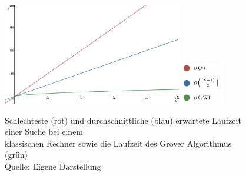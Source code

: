 \begin{figure}
    \centering
	\includegraphics[width=0.7\textwidth]{figures/laufzeit-aufgabenstellung.jpg}
    \includegraphics[width=0.165\textwidth]{figures/legende.png}

    \caption{Schlechteste (rot) und durchschnittliche (blau) erwartete Laufzeit einer Suche bei einem 
    \\klassischen Rechner sowie die Laufzeit des Grover Algorithmus (grün) 
    \\Quelle: Eigene Darstellung}

	\label{fig:laufzeitAufgabenstellung}
\end{figure}